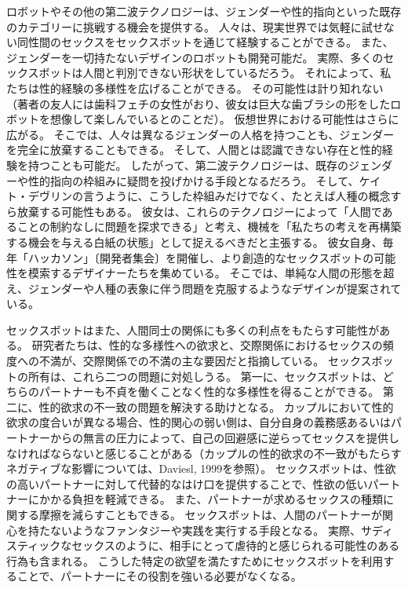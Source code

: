 \documentclass[paper=a4,book,openany]{jlreq}
\begin{document}
ロボットやその他の第二波テクノロジーは、ジェンダーや性的指向といった既存のカテゴリーに挑戦する機会を提供する。
人々は、現実世界では気軽に試せない同性間のセックスをセックスボットを通じて経験することができる。
また、ジェンダーを一切持たないデザインのロボットも開発可能だ。
実際、多くのセックスボットは人間と判別できない形状をしているだろう。
それによって、私たちは性的経験の多様性を広げることができる。
その可能性は計り知れない（著者の友人には歯科フェチの女性がおり、彼女は巨大な歯ブラシの形をしたロボットを想像して楽しんでいるとのことだ）。
仮想世界における可能性はさらに広がる。
そこでは、人々は異なるジェンダーの人格を持つことも、ジェンダーを完全に放棄することもできる。
そして、人間とは認識できない存在と性的経験を持つことも可能だ。
したがって、第二波テクノロジーは、既存のジェンダーや性的指向の枠組みに疑問を投げかける手段となるだろう。
そして、ケイト・デヴリンの言うように、こうした枠組みだけでなく、たとえば人種の概念すら放棄する可能性もある。
彼女は、これらのテクノロジーによって「人間であることの制約なしに問題を探求できる」と考え、機械を「私たちの考えを再構築する機会を与える白紙の状態」として捉えるべきだと主張する\citep{devlin15:_in_defen_sex_machin}。
彼女自身、毎年「ハッカソン」〔開発者集会〕を開催し、より創造的なセックスボットの可能性を模索するデザイナーたちを集めている。
そこでは、単純な人間の形態を超え、ジェンダーや人種の表象に伴う問題を克服するようなデザインが提案されている。

セックスボットはまた、人間同士の関係にも多くの利点をもたらす可能性がある。
研究者たちは、性的な多様性への欲求と、交際関係におけるセックスの頻度への不満が、交際関係での不満の主な要因だと指摘している\citep[p.274]{selterman19:_motiv_extrad_infid_revis}。
セックスボットの所有は、これら二つの問題に対処しうる。
第一に、セックスボットは、どちらのパートナーも不貞を働くことなく性的な多様性を得ることができる。
第二に、性的欲求の不一致の問題を解決する助けとなる。
カップルにおいて性的欲求の度合いが異なる場合、性的関心の弱い側は、自分自身の義務感あるいはパートナーからの無言の圧力によって、自己の回避感に逆らってセックスを提供しなければならないと感じることがある（カップルの性的欲求の不一致がもたらすネガティブな影響については、Daviesl, 1999を参照）\nocite{davies99:_sexual_desir_discr}。
セックスボットは、性欲の高いパートナーに対して代替的なはけ口を提供することで、性欲の低いパートナーにかかる負担を軽減できる。
また、パートナーが求めるセックスの種類に関する摩擦を減らすこともできる。
セックスボットは、人間のパートナーが関心を持たないようなファンタジーや実践を実行する手段となる。
実際、サディスティックなセックスのように、相手にとって虐待的と感じられる可能性のある行為も含まれる。
こうした特定の欲望を満たすためにセックスボットを利用することで、パートナーにその役割を強いる必要がなくなる。
\end{document}
